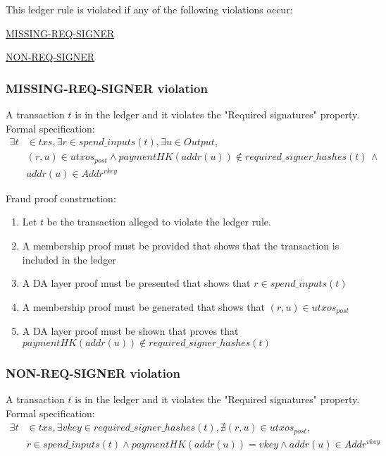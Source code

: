 \documentclass[../midgard.tex]{subfiles}
\begin{document}
This ledger rule is violated if any of the following violations occur:
\begin{itemize-multi}
  \item \hyperref[violation:MISSING-REQ-SIGNER]{MISSING-REQ-SIGNER}
  \item \hyperref[violation:NON-REQ-SIGNER]{NON-REQ-SIGNER}
\end{itemize-multi}

\subsubsection{MISSING-REQ-SIGNER violation}
\label{violation:MISSING-REQ-SIGNER}
A transaction $t$ is in the ledger and it violates the "Required signatures" property.
Formal specification:
\begin{equation*}
\begin{split}
    \exists t & \in txs, \exists r \in spend\_inputs(t), \exists u \in Output, \\
    & (r, u) \in utxos_{post} \land paymentHK(addr(u)) \notin required\_signer\_hashes(t) \, \land \\
    & addr(u) \in Addr^{vkey}
\end{split}
\end{equation*}

Fraud proof construction:
\begin{enumerate}
  \item Let $t$ be the transaction alleged to violate the ledger rule. 
  \item A membership proof must be provided that shows that the transaction is included in the ledger
  \item A DA layer proof must be presented that shows that $r \in spend\_inputs(t)$
  \item A membership proof must be generated that shows that $(r, u) \in utxos_{post}$
  \item A DA layer proof must be shown that proves that \\ $paymentHK(addr(u)) \notin required\_signer\_hashes(t)$
\end{enumerate}

\subsubsection{NON-REQ-SIGNER violation}
\label{violation:NON-REQ-SIGNER}
A transaction $t$ is in the ledger and it violates the "Required signatures" property.
Formal specification:
\begin{equation*}
\begin{split}
    \exists t & \in txs, \exists vkey \in required\_signer\_hashes(t), \nexists (r, u) \in utxos_{post}, \\
    & r \in spend\_inputs(t) \land paymentHK(addr(u)) = vkey \land addr(u) \in Addr^{vkey}
\end{split}
\end{equation*}
\end{document}
